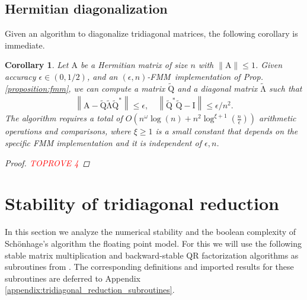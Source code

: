 \documentclass{article}
\newcommand{\lnorm}{\left\|}
\newcommand{\rnorm}{\right\|}
\newcommand{\lpar}{\left(}
\newcommand{\rpar}{\right)}
\newtheorem{corollary}{Corollary}[section]
\newcommand\matA{\boldsymbol{\mathrm{A}}}
\newcommand\matI{\boldsymbol{\mathrm{I}}}
\newcommand\matQtilde{\widetilde{\boldsymbol{\mathrm{Q}}}}
\newcommand\matLambdatilde{\widetilde{\boldsymbol{\mathrm{\Lambda}}}}
\newcommand{\cfmm}{\xi}
\newcommand{\fmmalgo}{FMM} \usepackage[utf8]{inputenc}
\begin{document}
    \subsection{Hermitian diagonalization}
    Given an algorithm to diagonalize tridiagonal matrices, the following corollary is immediate.
    \begin{corollary}
    \label{corollary:hermitian_diagonalization}
    Let $\matA$ be a Hermitian matrix of size $n$ with $\|\matA\|\leq 1$. Given accuracy $\epsilon\in(0,1/2)$, and an $(\epsilon,n)$-\fmmalgo\   implementation of Prop. \ref{proposition:fmm}, we can compute a matrix $\matQtilde$ and a diagonal matrix $\matLambdatilde$ such that
    \begin{align*}
        \lnorm \matA - \matQtilde\matLambdatilde\matQtilde^* \rnorm \leq \epsilon,
        \quad
        \lnorm \matQtilde^* \matQtilde - \matI \rnorm \leq \epsilon/n^2.
    \end{align*}
    The algorithm requires a total of $O\lpar n^\omega\log(n) + n^2\log^{\cfmm+1}(\tfrac{n}{\epsilon})\rpar$ arithmetic operations and comparisons, where $\xi\geq 1$ is a small constant that depends on the specific FMM implementation and it is independent of $\epsilon,n$.
    \begin{proof}\textcolor{red}{TOPROVE 4}\end{proof}
    \end{corollary}

\section{Stability of tridiagonal reduction}
\label{section:tridiagonal_reduction_stability}
In this section we analyze the numerical stability and the boolean complexity of  Schönhage's algorithm the floating point model. For this we will use the following stable matrix multiplication and backward-stable QR factorization algorithms as subroutines from \cite{demmel2007fastla,demmel2007fastmm}. 
The corresponding definitions and imported results for these subroutines are deferred to Appendix \ref{appendix:tridiagonal_reduction_subroutines}.
\end{document}
